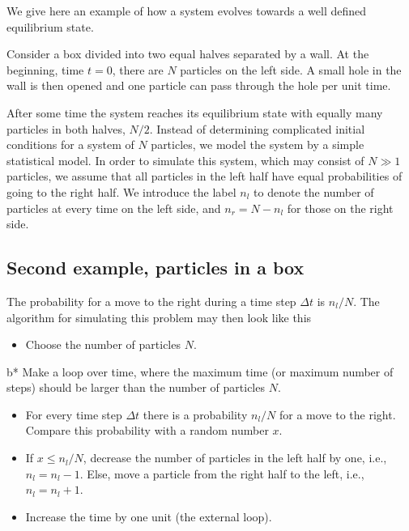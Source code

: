 \documentclass[%
oneside,                 %
final,                   %
10pt]{article}
\newenvironment{block_mdfboxadmon}[1][]{
\begin{block_mdfboxmdframed}[frametitle=#1]
}
{
\end{block_mdfboxmdframed}
}
\begin{document}
\begin{block_mdfboxadmon}[]

We give here an example of how a system evolves towards 
a well defined equilibrium state.

Consider a box divided into two equal halves separated by a wall.
At the beginning, time $t=0$, there are $N$ particles on the left
side. A small hole in the wall is then opened and one particle
can pass through the hole per unit time. 

After some time the system reaches its equilibrium state with
equally many particles in both halves, $N/2$. 
Instead of determining complicated initial conditions for a system 
of $N$ particles, we model the system by a simple statistical model. 
In order to simulate this system, which may consist of $N \gg 1$ particles,
we assume that all particles in the left half have equal probabilities
of going to the right half. 
We introduce the label $n_l$ to denote the 
 number of particles at every time on the left side, and $n_r=N-n_l$ for those
on the right side.
\end{block_mdfboxadmon} %




\subsection{Second example, particles in a box}

\begin{block_mdfboxadmon}[]
The probability for a move to the right during a time step  $\Delta t$
is $n_l/N$. The algorithm for simulating this problem may then look
like this

\begin{itemize}
  \item Choose the number of particles $N$.
\end{itemize}

\noindent
  b* Make a loop over time, where the maximum time (or maximum number of steps) should be larger than the number of particles $N$.

\begin{itemize}
  \item For every time step $\Delta t$ there is a probability $n_l/N$  for a move to the right. Compare this probability with a random number $x$.

  \item If $ x \le n_l/N$, decrease the number of particles in the left half by one, i.e., $n_l=n_l-1$. Else, move a particle from the  right half to the left, i.e., $n_l=n_l+1$.

  \item Increase the time by one unit (the external loop).
\end{itemize}

\noindent
\end{block_mdfboxadmon} %
\end{document}
